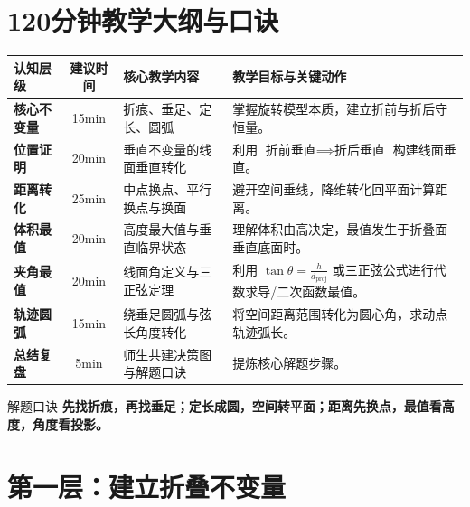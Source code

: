 \documentclass[11pt,a4paper]{ctexart}
\begin{document}
\section{120分钟教学大纲与口诀}

\begin{center}
\renewcommand{\arraystretch}{1.2}
\begin{tabularx}{0.95\linewidth}{>{\bfseries}p{2.2cm} c p{4.5cm} X}
\toprule
认知层级 & 建议时间 & 核心教学内容 & 教学目标与关键动作 \\
\midrule
核心不变量 & 15min & 折痕、垂足、定长、圆弧 & 掌握旋转模型本质，建立折前与折后守恒量。 \\
位置证明 & 20min & 垂直不变量的线面垂直转化 & 利用 $\text{折前垂直} \implies \text{折后垂直}$ 构建线面垂直。 \\
距离转化 & 25min & 中点换点、平行换点与换面 & 避开空间垂线，降维转化回平面计算距离。 \\
体积最值 & 20min & 高度最大值与垂直临界状态 & 理解体积由高决定，最值发生于折叠面垂直底面时。 \\
夹角最值 & 20min & 线面角定义与三正弦定理 & 利用 $\tan\theta = \frac{h}{d_{\text{proj}}}$ 或三正弦公式进行代数求导/二次函数最值。 \\
轨迹圆弧 & 15min & 绕垂足圆弧与弦长角度转化 & 将空间距离范围转化为圆心角，求动点轨迹弧长。 \\
总结复盘 & 5min & 师生共建决策图与解题口诀 & 提炼核心解题步骤。 \\
\bottomrule
\end{tabularx}
\end{center}

\begin{keybox}{解题口诀}
  \textbf{先找折痕，再找垂足；定长成圆，空间转平面；距离先换点，最值看高度，角度看投影。}
\end{keybox}

\newpage

\section{第一层：建立折叠不变量}
\end{document}
